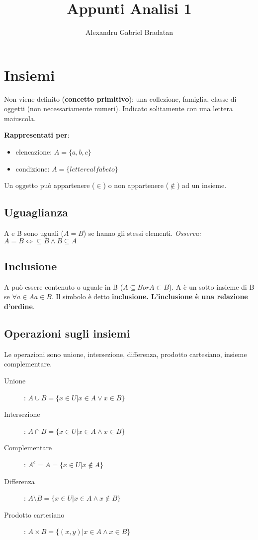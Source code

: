 \documentclass[a4paper,12pt,oneside]{article}
\title{Appunti Analisi 1}
\author{Alexandru Gabriel Bradatan}
\date{}
\begin{document}
\maketitle

\section{Insiemi}
Non viene definito (\textbf{concetto primitivo}): una collezione, famiglia,
classe di oggetti (non necessariamente numeri). Indicato solitamente con una
lettera maiuscola.

\textbf{Rappresentati per}:
\begin{itemize}
    \item elencazione: \(A = \{a, b, c\}\)
    \item condizione: \(A = \{lettere alfabeto\}\)
\end{itemize}

Un oggetto può appartenere ($\in$) o non appartenere ($\notin$) ad un insieme.

\subsection{Uguaglianza}
A e B sono uguali ($A = B$) se hanno gli stessi elementi.
\textit{Osserva: $A = B \iff \subseteq B \wedge B \subseteq A$}

\subsection{Inclusione}
A può essere contenuto o uguale in B ($A \subseteq B or A \subset B$).
A è un sotto insieme di B se $\forall a \in A a \in B$. Il simbolo è detto
\textbf{inclusione. L'inclusione è una relazione d'ordine}.

\subsection{Operazioni sugli insiemi}
Le operazioni sono unione, intersezione, differenza, prodotto cartesiano,
insieme complementare.

\begin{description}
    \item[Unione]: $A \cup B = \{ x \in U | x \in A \vee x \in B \}$
    \item[Intersezione]: $A \cap B = \{ x \in U | x \in A \wedge x \in B \}$
    \item[Complementare]: $A^c = \bar{A} = \{ x \in U | x \notin A \}$
    \item[Differenza]: $A \setminus B = \{ x \in U | x \in A \wedge x \notin B \}$
    \item[Prodotto cartesiano]: $A \times B = \{ (x,y) | x \in A \wedge x \in B \}$
\end{description}
\end{document}
